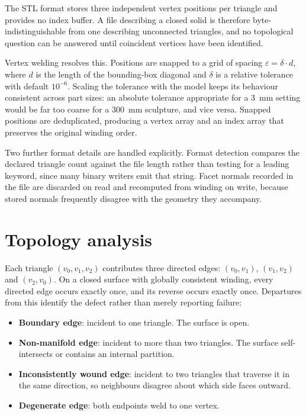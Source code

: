 \documentclass[11pt, a4paper]{article}
\begin{document}
The STL format stores three independent vertex positions per triangle and
provides no index buffer. A file describing a closed solid is therefore
byte-indistinguishable from one describing unconnected triangles, and no
topological question can be answered until coincident vertices have been
identified.

Vertex welding resolves this. Positions are snapped to a grid of spacing
$\varepsilon = \delta \cdot d$, where $d$ is the length of the bounding-box
diagonal and $\delta$ is a relative tolerance with default $10^{-6}$. Scaling
the tolerance with the model keeps its behaviour consistent across part sizes:
an absolute tolerance appropriate for a \qty{3}{mm} setting would be far too
coarse for a \qty{300}{mm} sculpture, and vice versa. Snapped positions are
deduplicated, producing a vertex array and an index array that preserves the
original winding order.

Two further format details are handled explicitly. Format detection compares
the declared triangle count against the file length rather than testing for a
leading  keyword, since many binary writers emit that string.
Facet normals recorded in the file are discarded on read and recomputed from
winding on write, because stored normals frequently disagree with the geometry
they accompany.

\section{Topology analysis}

Each triangle $(v_0, v_1, v_2)$ contributes three directed edges: $(v_0,v_1)$,
$(v_1,v_2)$ and $(v_2,v_0)$. On a closed surface with globally consistent
winding, every directed edge occurs exactly once, and its reverse occurs
exactly once. Departures from this identify the defect rather than merely
reporting failure:

\begin{itemize}
  \item \textbf{Boundary edge}: incident to one triangle. The surface is open.
  \item \textbf{Non-manifold edge}: incident to more than two triangles. The
        surface self-intersects or contains an internal partition.
  \item \textbf{Inconsistently wound edge}: incident to two triangles that
        traverse it in the same direction, so neighbours disagree about which
        side faces outward.
  \item \textbf{Degenerate edge}: both endpoints weld to one vertex.
\end{itemize}
\end{document}
